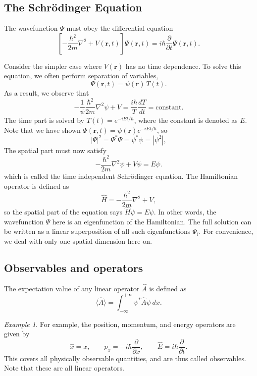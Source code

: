 \documentclass[11pt]{article}
\newcommand\ve[1]{\boldsymbol{#1}}
\newcommand\ddt[1]{\frac{d #1}{d t}}
\newcommand\ppx[1]{\frac{\partial #1}{\partial x}}
\newcommand\ppt[1]{\frac{\partial #1}{\partial t}}
\newcommand\lapl[1]{\nabla^2 #1}
\newcommand\E[1]{\langle #1 \rangle}
\theoremstyle{definition}
\theoremstyle{remark}
\newtheorem*{example}{Example}
\numberwithin{equation}{section}
\begin{document}
    \subsection{The Schr\"odinger Equation}
    \begin{theorem}
        The wavefunction $\Psi$ must obey the differential equation \[
            \left[-\frac{\hbar^2}{2m}\lapl{} + V(\ve{r}, t)\right]\Psi(\ve{r}, t) =
            i\hbar \ppt{}\Psi(\ve{r}, t).
        \] 
    \end{theorem}
    Consider the simpler case where $V(\ve{r})$ has no time dependence.
    To solve this equation, we often perform separation of variables, \[
        \Psi(\ve{r}, t) = \psi(\ve{r})\, T(t).
    \] As a result, we observe that \[
        -\frac{1}{\psi}\frac{\hbar^2}{2m}\lapl{\psi} + V = \frac{i\hbar}{T}\ddt{T} =
        \text{constant}.
    \] The time part is solved by $T(t) = e^{-i E t/ \hbar}$, where the constant is
    denoted as $E$.  Note that we have shown $\Psi(\ve{r}, t) = \psi(\ve{r}) e^{-iEt
    /\hbar}$, so \[
        |\Psi|^2 = \Psi^*\Psi = \psi^*\psi = |\psi^2|,
    \] The spatial part must now satisfy \[
        -\frac{\hbar^2}{2m} \lapl{\psi} + V\psi = E\psi.
    \] which is called the time independent Schr\"odinger equation.
    The Hamiltonian operator is defined as \[
        \hat{H} = -\frac{\hbar^2}{2m}\lapl{} + V,
    \] so the spatial part of the equation says $\hat{H}\psi = E\psi$.
    In other words, the wavefunction $\Psi$ here is an eigenfunction of the
    Hamiltonian. The full solution can be written as a linear superposition of all
    such eigenfunctions $\Psi_i$.
    For convenience, we deal with only one spatial dimension here on.

    \subsection{Observables and operators}
    \begin{definition}
        The expectation value of any linear operator $\hat{A}$ is defined as \[
            \E{\hat{A}} = \int_{-\infty}^{+\infty} \psi^* \hat{A} \psi \:dx.
        \]
    \end{definition}
    \begin{example}
        For example, the position, momentum, and energy operators are given by \[
            \hat{x} = x, \qquad \hat{p}_x = -i\hbar \ppx{}, \qquad \hat{E} = i\hbar
            \ppt{}.
        \] 
        This covers all physically observable quantities, and are thus called
        observables. Note that these are all linear operators.
    \end{example}
\end{document}
